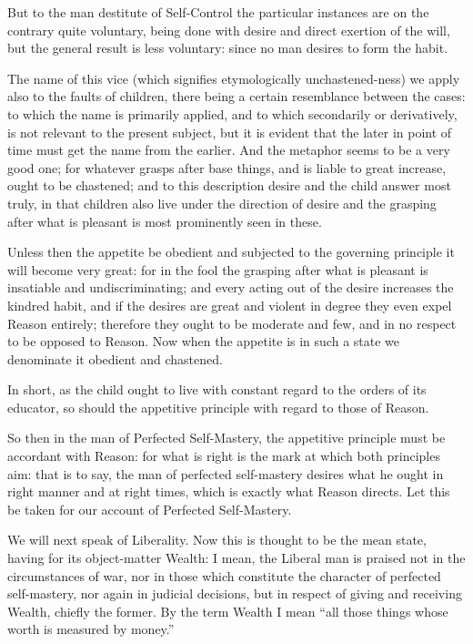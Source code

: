 But to the man destitute of Self-Control the particular instances are on the
contrary quite voluntary, being done with desire and direct exertion of the
will, but the general result is less voluntary: since no man desires to form
the habit.

The name of this vice (which signifies etymologically unchastened-ness) we
apply also to the faults of children, there being a certain resemblance between
the cases: to which the name is primarily applied, and to which secondarily or
derivatively, is not relevant to the present subject, but it is evident that
the later in point of time must get the name from the earlier. And the metaphor
seems to be a very good one; for whatever grasps after base things, and is
liable to great increase, ought to be chastened; and to this description desire
and the child answer most truly, in that children also live under the direction
of desire and the grasping after what is pleasant is most prominently seen in
these.

Unless then the appetite be obedient and subjected to the governing principle
it will become very great: for in the fool the grasping after what is pleasant
is insatiable and undiscriminating; and every acting out of the desire
increases the kindred habit, and if the desires are great and violent in degree
they even expel Reason entirely; therefore they ought to be moderate and few,
and in no respect to be opposed to Reason. Now when the appetite is in such a
state we denominate it obedient and chastened.

In short, as the child ought to live with constant regard to the orders of its
educator, so should the appetitive principle with regard to those of Reason.

So then in the man of Perfected Self-Mastery, the appetitive principle must be
accordant with Reason: for what is right is the mark at which both principles
aim: that is to say, the man of perfected self-mastery desires what he ought in
right manner and at right times, which is exactly what Reason directs. Let this
be taken for our account of Perfected Self-Mastery.



We will next speak of Liberality. Now this is thought to be the mean state,
having for its object-matter Wealth: I mean, the Liberal man is praised not in
the circumstances of war, nor in those which constitute the character of
perfected self-mastery, nor again in judicial decisions, but in respect of
giving and receiving Wealth, chiefly the former. By the term Wealth I mean
“all those things whose worth is measured by money.”


